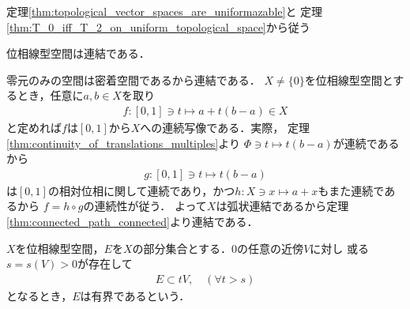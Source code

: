 	\begin{sketch}
		定理\ref{thm:topological_vector_spaces_are_uniformazable}と
		定理\ref{thm:T_0_iff_T_2_on_uniform_topological_space}から従う
		\QED
	\end{sketch}
	
	\begin{screen}
		\begin{thm}[位相線型空間の連結性]\label{thm:topological_vector_spaces_connected}
			位相線型空間は連結である．
		\end{thm}
	\end{screen}
	
	\begin{prf}
		零元のみの空間は密着空間であるから連結である．
		$X \neq \{0\}$を位相線型空間とするとき，任意に$a,b \in X$を取り
		\begin{align}
			f:[0,1] \ni t \longmapsto a + t(b - a) \in X
		\end{align}
		と定めれば$f$は$[0,1]$から$X$への連続写像である．実際，
		定理\ref{thm:continuity_of_translations_multiples}より
		$\Phi \ni t \longmapsto t(b-a)$が連続であるから
		\begin{align}
			g:[0,1] \ni t \longmapsto t(b-a)
		\end{align}
		は$[0,1]$の相対位相に関して連続であり，かつ$h:X \ni x \longmapsto a + x$もまた連続であるから
		$f = h \circ g$の連続性が従う．
		よって$X$は弧状連結であるから定理\ref{thm:connected_path_connected}より連結である．
		\QED
	\end{prf}
	
	\begin{screen}
		\begin{dfn}[位相線形空間の有界集合]\label{def:boundedness_in_tvs}
			$X$を位相線型空間，$E$を$X$の部分集合とする．0の任意の近傍$V$に対し
			或る$s = s(V) > 0$が存在して
			\begin{align}
				E \subset t V, \quad (\forall t > s)
			\end{align}
			となるとき，$E$は有界であるという．
		\end{dfn}
	\end{screen}
	
	\begin{screen}
		\begin{thm}
		\end{thm}
	\end{screen}
	

